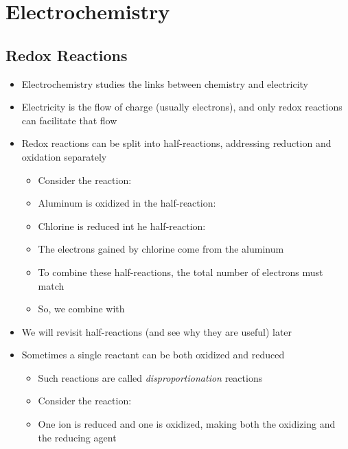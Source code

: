 \documentclass[12pt, openany, letterpaper]{memoir}
\begin{document}
\chapter{Electrochemistry}
\section{Redox Reactions}
\begin{itemize}
	\item Electrochemistry studies the links between chemistry and electricity
	\item Electricity is the flow of charge (usually electrons), and only redox reactions can facilitate that flow
	\item Redox reactions can be split into half-reactions, addressing reduction and oxidation separately
	\begin{itemize}
		\item Consider the reaction: 
		\item Aluminum is oxidized in the half-reaction: 
		\item Chlorine is reduced int he half-reaction: 
		\item The electrons gained by chlorine come from the aluminum
		\item To combine these half-reactions, the total number of electrons must match
		\item So, we combine  with 
	\end{itemize}
	\item We will revisit half-reactions (and see why they are useful) later
	\item Sometimes a single reactant can be both oxidized and reduced
	\begin{itemize}
		\item Such reactions are called \emph{disproportionation} reactions
		\item Consider the reaction: 
		\item One  ion is reduced and one is oxidized, making  both the oxidizing and the reducing agent
	\end{itemize}
\end{itemize}
\end{document}
